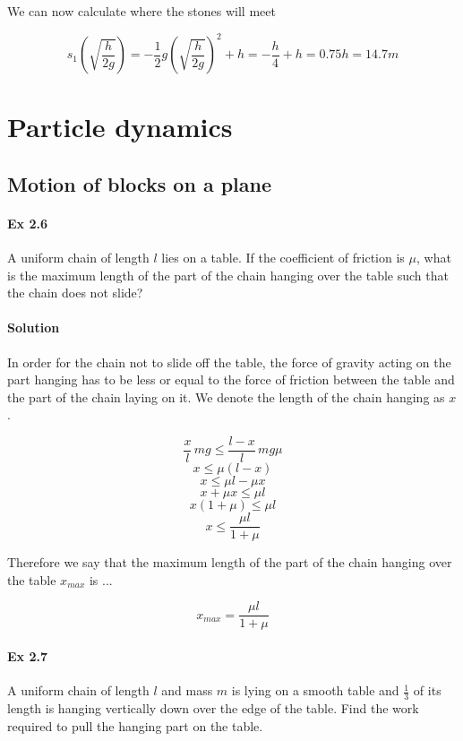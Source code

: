 \documentclass{article}
\begin{document}
We can now calculate where the stones will meet

\[ s_1 \left( \sqrt{\frac{h}{2g}} \right) = -\frac{1}{2}g \left( \sqrt{\frac{h}{2g}} \right)^2 + h = -\frac{h}{4} + h = 0.75 h = 14.7m \]


\section{Particle dynamics}
\subsection{Motion of blocks on a plane}

\paragraph{Ex 2.6}
A uniform chain of length $l$ lies on a table. If the coefficient of friction is $\mu$, what is the maximum length of the part of the chain hanging over the table such that the chain does not slide?
\paragraph{Solution}

In order for the chain not to slide off the table, the force of gravity acting on the part hanging has to be less or equal to the force of friction between the table and the part of the chain laying on it. We denote the length of the chain hanging as $x$.

\[ \frac{x}{l} \, mg \leq \frac{l - x}{l} \, mg \mu \]
\[ x \leq \mu \left( l - x \right) \]
\[ x \leq \mu l - \mu x \]
\[ x + \mu x \leq \mu l \]
\[ x \left( 1 + \mu \right) \leq \mu l \]
\[ x \leq \frac{\mu l}{1 + \mu} \]

Therefore we say that the maximum length of the part of the chain hanging over the table $x_{max}$ is ...

\[x_{max} = \frac{\mu l}{1 + \mu}\]


\paragraph{Ex 2.7}
A uniform chain of length $l$ and mass $m$ is lying on a smooth table and $\frac{1}{3}$ of its length is hanging vertically down over the edge of the table. Find the work required to pull the hanging part on the table.
\end{document}
